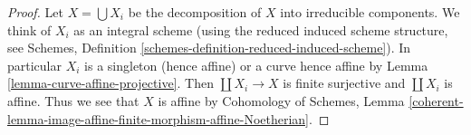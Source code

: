 \documentclass[10pt,a4paper]{amsart}
\theoremstyle{plain}
\theoremstyle{definition}
\theoremstyle{remark}
\numberwithin{equation}{subsection}
\begin{document}
\begin{proof}
Let $X = \bigcup X_i$ be the decomposition of $X$ into irreducible components.
We think of $X_i$ as an integral scheme (using the reduced induced scheme
structure, see Schemes, Definition
\ref{schemes-definition-reduced-induced-scheme}).
In particular $X_i$ is a singleton (hence affine) or a curve
hence affine by Lemma \ref{lemma-curve-affine-projective}.
Then $\coprod X_i \to X$ is finite surjective and $\coprod X_i$ is affine.
Thus we see that $X$ is affine by
Cohomology of Schemes, Lemma
\ref{coherent-lemma-image-affine-finite-morphism-affine-Noetherian}.
\end{proof}
\end{document}
